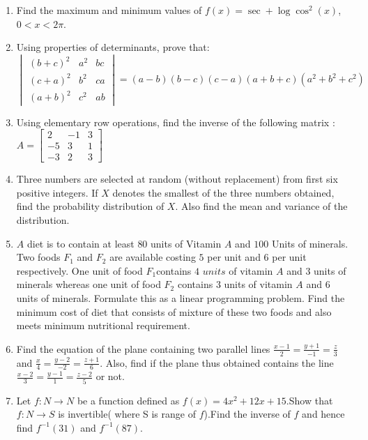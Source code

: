 \documentclass[12pt,-letter paper]{article}
\providecommand{\mydet}[1]{\ensuremath{\begin{vmatrix}#1\end{vmatrix}}}
\providecommand{\myvec}[1]{\ensuremath{\begin{bmatrix}#1\end{bmatrix}}}
\begin{document}
\begin{enumerate}
\item Find the maximum and minimum values of $f(x) =\sec+\log\cos^2(x)$, $0<x<2\pi$.
\item Using properties of determinants, prove that: 
$\mydet{ 
(b+c)^2 & a^2 & bc \\ 
(c+a)^2 & b^2 & ca \\ 
(a+b)^2 & c^2 & ab } =
(a-b)(b-c)(c-a)(a+b+c)(a^2+b^2+c^2)
$
\item Using elementary row operations, find the inverse of the following matrix : ${A}= \myvec{2&-1&3\\-5&3&1\\-3&2&3}$
\item Three numbers are selected at random (without replacement) from first six positive integers. If $X$ denotes the smallest of the three numbers obtained, find the probability distribution of $X$. Also find the mean and variance of the distribution.
\item $A$ diet is to contain at least $80$ units of Vitamin $A$ and $100$ Units of minerals. Two foods $F_1$ and $F_2$ are available costing \rupee$5$ per unit and \rupee$6$ per unit respectively. One unit of food $F_1$contains $4$ $units$ of vitamin $A$ and $3$ units of minerals whereas one unit of food $F_2$ contains $3$ units of vitamin $A$ and $6$ units of minerals. Formulate this as a linear programming problem. Find the minimum cost of diet that consists of mixture of these two foods and also meets minimum nutritional requirement.
\item  Find the equation of the plane containing two parallel lines  $\frac{x-1}{2}=\frac{y+1}{-1}=\frac{z}{3}$ and $\frac{x}{4}=\frac{y-2}{-2}=\frac{z+1}{6}.$ Also, find if the plane thus obtained contains  the line $\frac{x-2}{3}=\frac{y-1}{1}=\frac{z-2}{5}$ or not.
\item Let $f : N \rightarrow N$ be a function defined as $f(x)= 4x^{2}+12x+15$.Show that $f:N \rightarrow S$ is invertible( where S is range of $f$).Find the inverse of $f$ and hence find $f^{-1}(31)$ and $f^{-1}(87)$.
\end{enumerate}
\end{document}

